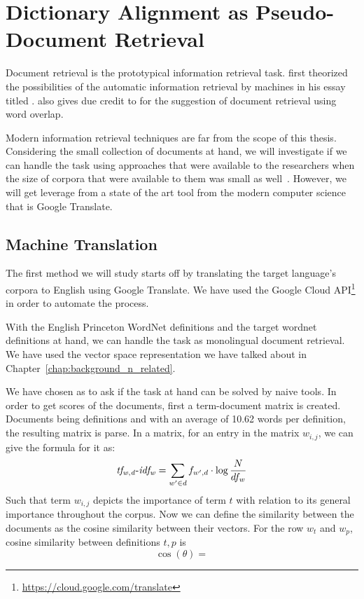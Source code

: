 
\chapter{Dictionary Alignment as Pseudo-Document Retrieval}%
\label{chap:retrieval}

Document retrieval is the prototypical information retrieval task.
\textcite{bush_as_1945} first theorized the possibilities of the automatic information retrieval by machines in his essay titled .
\textcite{singhal_modern_2001} also gives due credit to \textcite{luhn_statistical_1957} for the suggestion of document retrieval using word overlap.

Modern information retrieval techniques are far from the scope of this thesis.
Considering the small collection of documents at hand, we will investigate if we can handle the task using approaches that were available to the researchers when the size of corpora that were available to them was small as well~\cite{singhal_modern_2001}.
However, we will get leverage from a state of the art tool from the modern computer science that is Google Translate.

\section{Machine Translation}

The first method we will study starts off by translating the target language's corpora to English using Google Translate.
We have used the Google Cloud API\footnote{\url{https://cloud.google.com/translate}} in order to automate the process.

With the English Princeton WordNet definitions and the target wordnet definitions at hand, we can handle the task as monolingual document retrieval.
We have used the vector space representation we have talked about in Chapter~\ref{chap:background_n_related}.



We have chosen \tfidf{} as to ask if the task at hand can be solved by naive tools.
In order to get \tfidf{} scores of the documents, first a term-document matrix is created.
Documents being definitions and with an average of 10.62 words per definition, the resulting matrix is parse.
In a \tfidf{} matrix, for an entry in the matrix $w_{i,j}$, we can give the formula for it as:
\begin{equation*}
    {\operatorname{\mathit{tf_{w,d}-idf_{w}}}} = {\sum_{w' \in d}{f_{w',d}}} \cdot \log \frac {N} {df_w}
\end{equation*}
Such that term $w_{i,j}$ depicts the importance of term $t$ with relation to its general importance throughout the corpus.
Now we can define the similarity between the documents as the cosine similarity between their \tfidf{} vectors.
For the row $w_t$ and $w_p$, cosine similarity between definitions $t, p$ is
\begin{equation*}
    \cos(\theta) =
\end{equation*}

